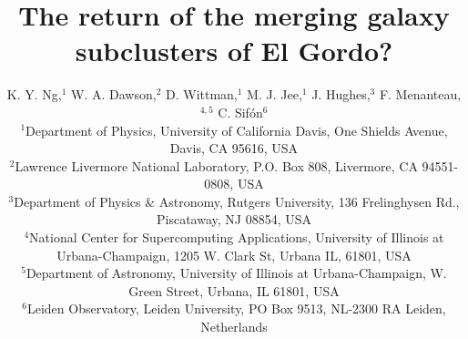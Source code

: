

\title[The return of the merging galaxy subclusters of El Gordo?]
{The return of the merging galaxy subclusters of El Gordo?}
\author[K. Y. Ng et al.]{K. Y. Ng,$^{1}$
	W. A. Dawson,$^{2}$ 
	D. Wittman,$^{1}$
	M. J. Jee,$^{1}$ 
	J. Hughes,$^{3}$ 
	F. Menanteau,$^{4, 5}$
	\newauthor
	C. Sif\'{o}n$^{6}$\\
$^{1}$Department of Physics, University of California Davis, One Shields
Avenue, Davis, CA 95616, USA\\ 
$^{2}$Lawrence Livermore National Laboratory, P.O. Box 808, Livermore, CA 94551-0808, USA \\
$^3$Department of Physics \& Astronomy,
Rutgers University, 136 Frelinghysen Rd., Piscataway, NJ 08854, USA\\
$^{4}$National Center for Supercomputing Applications, University of
Illinois at Urbana-Champaign, 1205 W. Clark St, Urbana IL, 61801, USA\\
$^{5}$Department of Astronomy, University of Illinois at Urbana-Champaign,
W. Green Street, Urbana, IL 61801, USA\\
$^{6}$Leiden Observatory, Leiden University, PO Box 9513, NL-2300 RA
Leiden, Netherlands\\}

